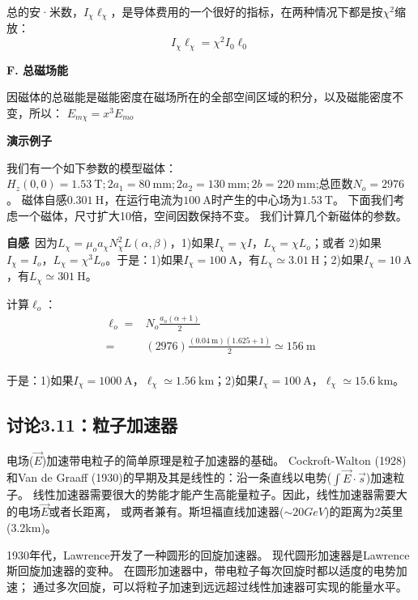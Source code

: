 总的安·米数，$I_\chi \ell_\chi$，是导体费用的一个很好的指标，在两种情况下都是按$\chi^2$缩放：
\begin{equation}
I_\chi \ell_\chi=\chi^2 I_0 \ell_0 %
\end{equation}

\textbf{F. 总磁场能}

因磁体的总磁能是磁能密度在磁场所在的全部空间区域的积分，以及磁能密度不变，所以：
$E_{m\chi}=x^3E_{mo}$

\textbf{演示例子}

我们有一个如下参数的模型磁体：$H_z(0, 0) = 1.53\ \mathrm{T}; 2a_1 =
80\ \mathrm{mm}; 2a_2 = 130\ \mathrm{mm}; 2b = 220\ \mathrm{mm}$;总匝数$N_o = 2976$。
磁体自感$0.301\ \mathrm{H}$，在运行电流为$100\ \mathrm{A}$时产生的中心场为$1.53\ \mathrm{T}$。
下面我们考虑一个磁体，尺寸扩大10倍，空间因数保持不变。
我们计算几个新磁体的参数。

\textbf{自感}\ 因为$L_\chi=\mu_o a_\chi N_\chi^2L(\alpha,\beta)$，1)如果$I_\chi=\chi I$，$L_\chi=\chi L_o$；或者
2)如果$I_\chi=I_o$，$L_\chi=\chi^3L_o$。于是：1)如果$I_\chi=100\ \mathrm{A}$，有$L_\chi\simeq 3.01\ \mathrm{H}$；2)如果$I_\chi=10\ \mathrm{A}$，有$L_\chi\simeq 301\ \mathrm{H}$。

计算$\ell_o$：
\begin{equation}
\begin{split}
\ell_{o}=&N_{o}\frac{a_{o}(\alpha+1)}{2}\\
=&(2976)\frac{(0.04\ \mathrm{m})(1.625+1)}{2}\simeq 156\ \mathrm{m}\\
\end{split}
\end{equation}

于是：1)如果$I_\chi=1000\ \mathrm{A}$，$\ell_{\chi}\simeq 1.56\ \mathrm{km}$；2)如果$I_\chi=100\ \mathrm{A}$，$\ell_{\chi}\simeq 15.6\ \mathrm{km}$。 
\newpage


\subsection{讨论3.11：粒子加速器}
电场($\vec{E}$)加速带电粒子的简单原理是粒子加速器的基础。
Cockroft-Walton (1928)和Van de Graaff (1930)的早期及其是线性的：沿一条直线以电势($\int\vec{E}\cdot\vec{s}$)加速粒子。
线性加速器需要很大的势能才能产生高能量粒子。因此，线性加速器需要大的电场$\vec{E}$或者长距离，
或两者兼有。斯坦福直线加速器($\sim 20 GeV$)的距离为2英里(3.2km)。

1930年代，Lawrence开发了一种圆形的回旋加速器。
现代圆形加速器是Lawrence斯回旋加速器的变种。
在圆形加速器中，带电粒子每次回旋时都以适度的电势加速；
通过多次回旋，可以将粒子加速到远远超过线性加速器可实现的能量水平。

